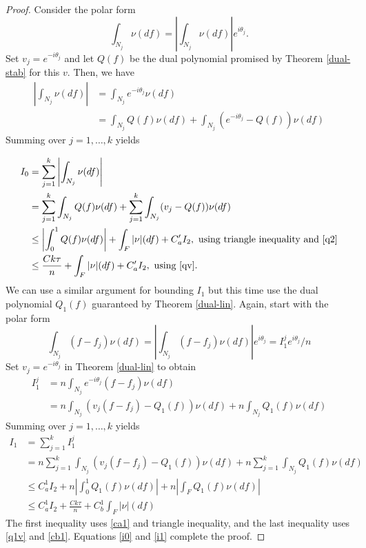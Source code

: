 \begin{proof} \label{apx:pf:I0I1} Consider the polar form \[ \int_{N_j} \nu (
df) = \left| \int_{N_j} \nu ( df) \right| e^{i \theta_j} . \] Set $v_j = e^{-i
\theta_j}$ and let $Q(f)$ be the dual polynomial promised by Theorem
\ref{dual-stab} for this $v$. Then, we have \begin{align*} \left| \int_{N_j} \nu
( d f) \right| & = \int_{N_j} e^{- i \theta_j} \nu ( d f)\\ & = \int_{N_j} Q (
f) \nu ( d f) + \int_{N_j} (e^{- i \theta_j} - Q ( f) ) \nu ( d f) \end{align*}
Summing over $j=1,\ldots,k$ yields

\begin{align}
\nonumber I_0 &= \sum_{j=1}^k \left| \int_{N_j} \nu(df) \right|\\
\nonumber & = \sum_{j=1}^k\int_{N_j} Q ( f) \nu ( d f) + 
\sum_{j=1}^k \int_{N_j} ( v_j - Q ( f)) \nu ( d f)\\
\nonumber & \leq \left|\int_0^1 Q(f) \nu(df) \right| + \int_F|\nu|(df) + C_a' I_2, \text{ using triangle inequality and \eqref{q2}}\\
\label{i0} & \leq \frac{C k \tau}{n} + \int_F|\nu|(df) + C_a' I_2, \text{ using \eqref{qv}}.
\end{align}
We can use a similar argument for bounding $I_1$ but this time use the dual polynomial $Q_1(f)$ guaranteed by Theorem \ref{dual-lin}. Again, start with the polar form
\[
  \int_{N_j} (f - f_j) \nu ( d f)  =  \left|
  \int_{N_j} (f - f_j) \nu ( d f) \right| e^{i \theta_j} = I_1^j e^{i\theta_j}/n
\]
Set $v_j = e^{-i \theta_j}$ in Theorem \ref{dual-lin} to obtain
{
\begin{align*}
  I_1^j & = 
  n\int_{N_j} e^{- i \theta_j} ( f - f_j) \nu ( d f)\\
  & =  n \int_{N_j} (v_j (
  f - f_j) - Q_1 ( f)) \nu ( d f)  + n\int_{N_j} Q_1 ( f) \nu ( d f)
\end{align*}
}
Summing over $j=1,\ldots,k$ yields
{
\begin{align}
\nonumber I_1 &= \sum_{j=1}^k I_1^j\\
\nonumber &= n \sum_{j=1}^k \int_{N_j} (v_j (
  f - f_j) - Q_1 ( f)) \nu ( d f) + n\sum_{j=1}^k\int_{N_j} Q_1 ( f) \nu ( d f)\\
\nonumber &\leq C_a^1 I_2 + n\left|\int_0^1 Q_1(f) \nu(df)\right| +  n\left |\int_F Q_1(f) \nu(df)\right |\\
\label{i1}& \leq C_a^1 I_2 + \frac{C k \tau}{n} +  C_b^1 \int_F|\nu|(df)
\end{align}
}
The first inequality uses \eqref{ca1} and triangle inequality, and the last inequality uses \eqref{q1v} and \eqref{cb1}. Equations \eqref{i0} and \eqref{i1} complete the proof.
\end{proof}	

